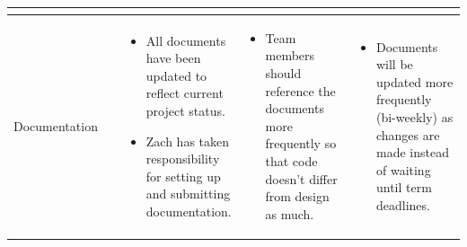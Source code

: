 \documentclass[letterpaper,10pt,titlepage,draftclsnofoot,onecolumn,onesided] {IEEEtran}
\begin{document}
\begin{center}
\begin{singlespace}
\begin{tabular}{ |  p{0.25\linewidth}  |  p{0.25\linewidth}  | p{0.25\linewidth} | p{0.25\linewidth} |}
\begin{itemize}
			\end{itemize} 
		\\ \hline
			Documentation 
		& 
			\begin{itemize}
				\item All documents have been updated to reflect current project status.
				\item Zach has taken responsibility for setting up and submitting documentation.
			\end{itemize}
		& 
			\begin{itemize}
				\item Team members should reference the documents more frequently so that code doesn't differ from design as much.
			\end{itemize}
		&
			\begin{itemize}
				\item Documents will be updated more frequently (bi-weekly) as changes are made instead of waiting until term deadlines.
			\end{itemize} 
		\\ \hline
		\end{tabular}
		\end{singlespace}
	\end{center}

\pagebreak


\end{document}
